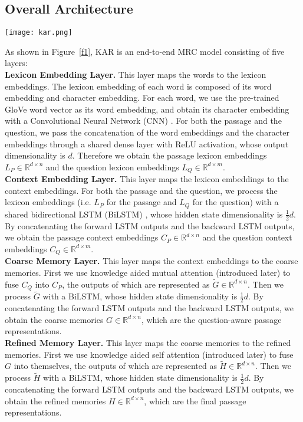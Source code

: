 \documentclass[11pt,a4paper]{article}
\begin{document}
\subsection{Overall Architecture}
\begin{figure*}
\centering
\texttt{[image: kar.png]}
\caption{\label{f1} An end-to-end MRC model: Knowledge Aided Reader (KAR)}
\end{figure*}
As shown in Figure~\ref{f1}, KAR is an end-to-end MRC model consisting of five layers: \\
\textbf{Lexicon Embedding Layer.} This layer maps the words to the lexicon embeddings. The lexicon embedding of each word is composed of its word embedding and character embedding. For each word, we use the pre-trained GloVe \cite{penningtonjeffrey:2014} word vector as its word embedding, and obtain its character embedding with a Convolutional Neural Network (CNN) \cite{kimyoon:2014}. For both the passage and the question, we pass the concatenation of the word embeddings and the character embeddings through a shared dense layer with ReLU activation, whose output dimensionality is $d$. Therefore we obtain the passage lexicon embeddings $L_P \in \mathbb{R}^{d \times n}$ and the question lexicon embeddings $L_Q \in \mathbb{R}^{d \times m}$. \\
\textbf{Context Embedding Layer.} This layer maps the lexicon embeddings to the context embeddings. For both the passage and the question, we process the lexicon embeddings (i.e. $L_P$ for the passage and $L_Q$ for the question) with a shared bidirectional LSTM (BiLSTM) \cite{hochreitersepp:1997}, whose hidden state dimensionality is $\frac{1}{2}d$. By concatenating the forward LSTM outputs and the backward LSTM outputs, we obtain the passage context embeddings $C_P \in \mathbb{R}^{d \times n}$ and the question context embeddings $C_Q \in \mathbb{R}^{d \times m}$. \\
\textbf{Coarse Memory Layer.} This layer maps the context embeddings to the coarse memories. First we use knowledge aided mutual attention (introduced later) to fuse $C_Q$ into $C_P$, the outputs of which are represented as $\tilde{G} \in \mathbb{R}^{d \times n}$. Then we process $\tilde{G}$ with a BiLSTM, whose hidden state dimensionality is $\frac{1}{2}d$. By concatenating the forward LSTM outputs and the backward LSTM outputs, we obtain the coarse memories $G \in \mathbb{R}^{d \times n}$, which are the question-aware passage representations. \\
\textbf{Refined Memory Layer.} This layer maps the coarse memories to the refined memories. First we use knowledge aided self attention (introduced later) to fuse $G$ into themselves, the outputs of which are represented as $\tilde{H} \in \mathbb{R}^{d \times n}$. Then we process $\tilde{H}$ with a BiLSTM, whose hidden state dimensionality is $\frac{1}{2}d$. By concatenating the forward LSTM outputs and the backward LSTM outputs, we obtain the refined memories $H \in \mathbb{R}^{d \times n}$, which are the final passage representations. \\
\end{document}

